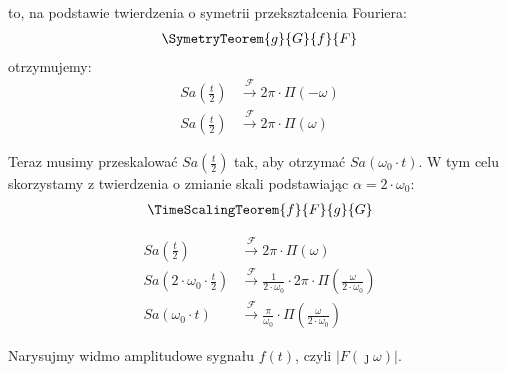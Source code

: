 \begin{task}
to, na podstawie twierdzenia o symetrii przekształcenia Fouriera:
\begin{align*}
\SymetryTeorem{g}{G}{f}{F}
\end{align*}
otrzymujemy:
\begin{align*}
Sa\left(\frac{t}{2}\right) &\xrightarrow{\mathcal F} 2\pi \cdot \Pi(-\omega)\\
Sa\left(\frac{t}{2}\right) &\xrightarrow{\mathcal F} 2\pi \cdot \Pi(\omega)
\end{align*}

Teraz musimy przeskalować $Sa\left(\frac{t}{2}\right)$ tak, aby otrzymać $Sa\left(\omega_0 \cdot t\right)$. W tym celu skorzystamy z twierdzenia o zmianie skali podstawiając $\alpha=2 \cdot \omega_0$:
\begin{align*}
\TimeScalingTeorem{f}{F}{g}{G}
\end{align*}

\begin{align*}
Sa\left(\frac{t}{2}\right) &\xrightarrow{\mathcal F} 2\pi \cdot \Pi(\omega)\\
Sa\left(2 \cdot \omega_0 \cdot \frac{t}{2}\right) &\xrightarrow{\mathcal F} \frac{1}{2 \cdot \omega_0} \cdot 2\pi \cdot \Pi(\frac{\omega}{2 \cdot \omega_0})\\
Sa\left(\omega_0 \cdot t\right) &\xrightarrow{\mathcal F} \frac{\pi}{\omega_0} \cdot \Pi(\frac{\omega}{2 \cdot \omega_0})
\end{align*}

Narysujmy widmo amplitudowe sygnału $f(t)$, czyli $\left|F(\jmath \omega)\right|$.

\begin{figure}[H]
	\centering
\end{figure}


\end{task}
